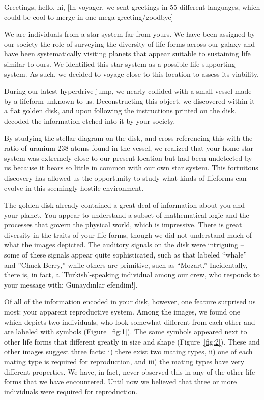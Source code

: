 
Greetings, hello, hi, [In voyager, we sent greetings in 55 different languages, which could be cool to merge in one mega greeting/goodbye]

We are individuals from a star system far from yours. We have been assigned by our society the role of surveying the diversity of life forms across our galaxy and have been systematically visiting planets that appear suitable to sustaining life similar to ours. We identified this star system as a possible life-supporting system. As such, we decided to voyage close to this location to assess its viability.

During our latest hyperdrive jump, we nearly collided with a small vessel made by a lifeform unknown to us. Deconstructing this object, we discovered within it a flat golden disk, and upon following the instructions printed on the disk, decoded the information etched into it by your society. 

By studying the stellar diagram on the disk, and cross-referencing this with the ratio of uranium-238 atoms found in the vessel, we realized that your home star system was extremely close to our present location but had been undetected by us because it bears so little in common with our own star system. This fortuitous discovery has allowed us the opportunity to study what kinds of lifeforms can evolve in this seemingly hostile environment. 

The golden disk already contained a great deal of information about you and your planet. You appear to understand a subset of mathematical logic and the processes that govern the physical world, which is impressive. There is great diversity in the traits of your life forms, though we did not understand much of what the images depicted. The auditory signals on the disk were intriguing -- some of these signals appear quite sophisticated, such as that labeled ``whale'' and ''Chuck Berry,'' while others are primitive, such as ``Mozart.'' Incidentally, there is, in fact, a 'Turkish'-speaking individual among our crew, who responds to your message with: Günaydınlar efendim!]. 

Of all of the information encoded in your disk, however, one feature surprised us most: your apparent reproductive system. Among the images, we found one which depicts two individuals, who look somewhat different from each other and are labeled with symbols (Figure~\ref{fig:1}). The same symbols appeared next to other life forms that different greatly in size and shape (Figure~\ref{fig:2}). These and other images suggest three facts: i) there exist two mating types, ii) one of each mating type is required for reproduction, and iii) the mating types have very different properties. We have, in fact, never observed this in any of the other life forms that we have encountered. Until now we believed that three or more individuals were required for reproduction.

